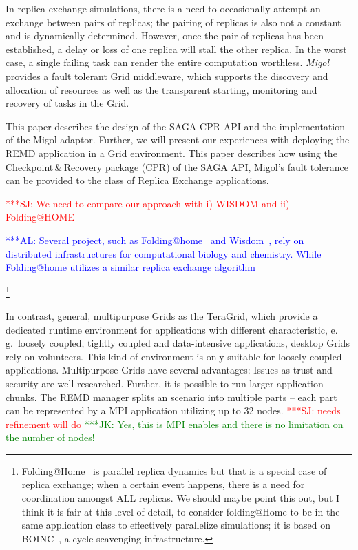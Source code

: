 \documentclass[times, 10pt,twocolumn]{article}
\newcommand{\kimnote}[1]{ {\textcolor{green} { ***JK: #1 }}}
\newcommand{\alnote}[1]{ {\textcolor{blue} { ***AL: #1 }}}
\newcommand{\jhanote}[1]{ {\textcolor{red} { ***SJ: #1 }}}
\newcommand{\kimnote}[1]{}
\newcommand{\alnote}[1]{}
\newcommand{\jhanote}[1]{}
\begin{document}
In replica exchange simulations, there is a need to occasionally
attempt an exchange between pairs of replicas; the pairing of replicas
is also not a constant and is dynamically determined. However, once
the pair of replicas has been established, a delay or loss of one
replica will stall the other replica. In the worst case, a single
failing task can render the entire computation worthless.
\emph{Migol}~\cite{schnorLuckow08} provides a fault tolerant Grid
middleware, which supports the discovery and allocation of resources
as well as the transparent starting, monitoring and recovery of tasks
in the Grid.

This paper describes the design of the SAGA CPR API and the
implementation of the Migol adaptor. Further, we will present our
experiences with deploying the REMD application in a Grid environment.
This paper describes how using the Checkpoint\,\&\,Recovery package
(CPR) of the SAGA API, Migol's fault tolerance can be provided to the
class of Replica Exchange applications.

\jhanote{We need to compare our approach with i) WISDOM and ii)
  Folding@HOME}             

\alnote{Several project, such as Folding@home~\cite{folding} and
  Wisdom~\cite{wisdom}, rely on distributed infrastructures for
  computational biology and chemistry. While Folding@home utilizes a
  similar replica exchange algorithm~\cite{PhysRevLett.86.4983}}


\footnote{Folding@Home~\cite{PhysRevLett.86.4983} is parallel replica
  dynamics but that is a special case of replica exchange; when a
  certain event happens, there is a need for coordination amongst ALL
  replicas. We should maybe point this out, but I think it is fair at
  this level of detail, to consider folding@Home to be in the same
  application class to effectively parallelize simulations; it is
  based on BOINC~\cite{1033223}, a cycle scavenging infrastructure.}

In contrast, general, multipurpose Grids as the TeraGrid, which
provide a dedicated runtime environment for applications with
different characteristic, e.\,g.\ loosely coupled, tightly coupled and
data-intensive applications, desktop Grids rely on volunteers. This
kind of environment is only suitable for loosely coupled
applications. Multipurpose Grids have several advantages: Issues as
trust and security are well researched. Further, it is possible to run
larger application chunks. The REMD manager splits an scenario into
multiple parts -- each part can be represented by a MPI application
utilizing up to 32 nodes. \jhanote{needs refinement will do}
\kimnote{Yes, this is MPI enables and there is no limitation on the
  number of nodes!}
\end{document}
